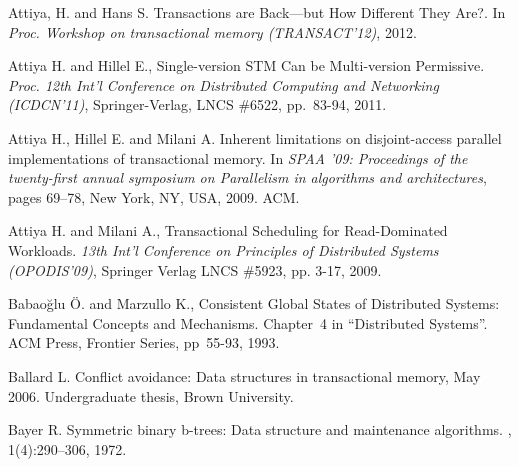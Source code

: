 \begin{thebibliography}{99}
{
Attiya, H. and Hans S.
\newblock Transactions are Back---but How Different They Are?.
\newblock In {\em Proc. Workshop on transactional memory (TRANSACT'12)}, 2012.



Attiya  H. and Hillel E.,
Single-version STM Can be Multi-version Permissive. 
{\it Proc. 12th Int'l Conference on Distributed Computing and Networking
(ICDCN'11)}, Springer-Verlag, LNCS \#6522, pp.~83-94, 2011.


Attiya H., Hillel E. and Milani A.
\newblock Inherent limitations on disjoint-access parallel implementations of
  transactional memory.
\newblock In {\em SPAA '09: Proceedings of the twenty-first annual symposium on
  Parallelism in algorithms and architectures}, pages 69--78, New York, NY,
  USA, 2009. ACM.




Attiya H. and Milani A., 
Transactional Scheduling for Read-Dominated Workloads. 
{\it 13th Int'l Conference on  Principles of Distributed Systems
(OPODIS'09)},  Springer Verlag  LNCS \#5923, pp. 3-17, 2009. 









Babao\u{g}lu \"{O}. and Marzullo K., 
Consistent Global States of Distributed Systems: Fundamental
Concepts and Mechanisms. Chapter~4 in ``Distributed Systems''.  
ACM Press, Frontier Series,  pp~55-93, 1993.


Ballard L.
\newblock Conflict avoidance: Data structures in transactional memory, May
  2006.
\newblock Undergraduate thesis, Brown University.



Bayer R.
\newblock Symmetric binary b-trees: Data structure and maintenance algorithms.
, 1(4):290--306, 1972.



}
\end{thebibliography}
